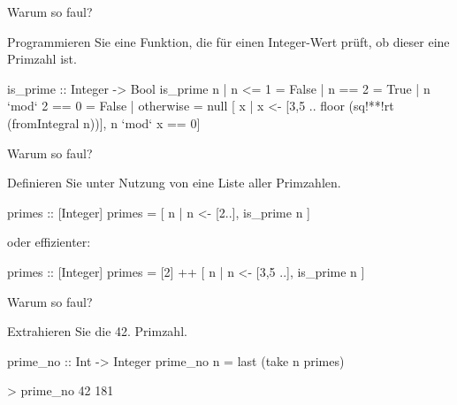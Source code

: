 \begin{frame}[fragile]{Warum so faul?}
    \begin{exercise}[a)]
    Programmieren Sie eine Funktion, die für einen Integer-Wert prüft, ob dieser eine Primzahl ist.
    \end{exercise}
    \begin{solve}[a)]
    \begin{plainhaskell}
is_prime :: Integer -> Bool
is_prime n
    | n <= 1 = False
    | n == 2 = True
    | n `mod` 2 == 0 = False
    | otherwise = null [ x | x <- [3,5 .. floor (sq!**!rt (fromIntegral n))], n `mod` x == 0]
    \end{plainhaskell}
    \end{solve}
\end{frame}
\resetframecounters
\begin{frame}[fragile]{Warum so faul?}
    \begin{exercise}[b)]
    Definieren Sie unter Nutzung von  eine Liste aller Primzahlen.
    \end{exercise}
    \begin{solve}[b)]
    \begin{plainhaskell}
primes :: [Integer]
primes = [ n | n <- [2..], is_prime n ]
    \end{plainhaskell}
    oder effizienter:
    \begin{plainhaskell}
primes :: [Integer]
primes = [2] ++ [ n | n <- [3,5 ..], is_prime n ]
    \end{plainhaskell}
    \end{solve}
\end{frame}
\resetframecounters
\begin{frame}[fragile]{Warum so faul?}
    \begin{exercise}[c)]
    Extrahieren Sie die 42. Primzahl.
    \end{exercise}
    \begin{solve}[c)]
    \begin{plainhaskell}
prime_no :: Int -> Integer
prime_no n = last (take n primes)
    \end{plainhaskell}
    \begin{plainbash}
> prime_no 42
181
    \end{plainbash}
    \end{solve}
\end{frame}